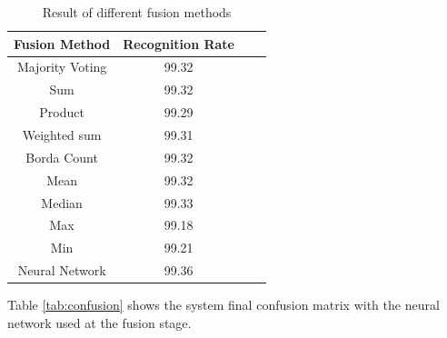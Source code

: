 \documentclass[conference]{IEEEtran}
\begin{document}
 \begin{table}
 \centering
\caption[Result of different fusion methods]{ Result of different fusion methods}
 \begin{tabular}{|c|c|c|c|}
  \hline
Fusion Method	& Recognition Rate		 \\  \hline
Majority Voting	&99.32	\\  \hline
	Sum	&99.32	\\ \hline
	Product	&99.29		\\   \hline
	Weighted sum	&99.31		\\  \hline
	 Borda Count	&99.32	\\ \hline
	Mean	&99.32	\\ \hline
	Median	&99.33		\\ \hline
	Max	&99.18		\\ \hline
	Min	&99.21		\\ \hline
	Neural Network 	& 99.36 \\ \hline
\end{tabular}
\label{tab:fusion}
\end{table}






Table \ref{tab:confusion} shows the system final confusion matrix with the neural network used at the fusion stage.
\end{document}
